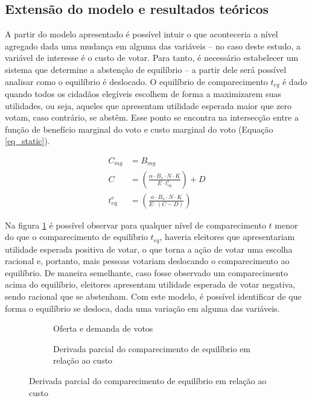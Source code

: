 \subsection{Extensão do modelo e resultados teóricos}

A partir do modelo apresentado é possível intuir o que aconteceria a nível agregado dada uma mudança em alguma das variáveis -- no caso deste estudo, a variável de interesse é o custo de votar. Para tanto, é necessário estabelecer um sistema que determine a abstenção de equilíbrio -- a partir dele será possível analisar como o equilíbrio é deslocado. O equilíbrio de comparecimento $t_{eq}$ é dado quando todos os cidadãos elegíveis escolhem de forma a maximizarem suas utilidades, ou seja, aqueles que apresentam utilidade esperada maior que zero votam, caso contrário, se abstêm. Esse ponto se encontra na intersecção entre a função de benefício marginal do voto e custo marginal do voto (Equação \ref{eq_static}). 

\begin{equation}
  \label{eq_static}
  \begin{aligned}
      C_{mg}&= B_{mg}\\
      C &=\left(\frac{\alpha\cdot B_s\cdot N\cdot K}{E\cdot t_{eq}^e}\right)+D \\
      t_{eq}^e&=\left(\frac{\alpha\cdot B_s\cdot N\cdot K}{E\cdot (C-D)}\right)
  \end{aligned}
  \end{equation}

Na figura \ref{fig_static1} é possível observar para qualquer nível de comparecimento $t$ menor do que o comparecimento de equilíbrio $t_{eq}$, haveria eleitores que apresentariam utilidade esperada positiva de votar, o que torna a ação de votar uma escolha racional e, portanto, mais pessoas votariam deslocando o comparecimento ao equilíbrio. De maneira semelhante, caso fosse observado um comparecimento acima do equilíbrio, eleitores apresentam utilidade esperada de votar negativa, sendo racional que se abstenham. Com este modelo, é possível identificar de que forma o equilíbrio se desloca, dada uma variação em alguma das variáveis.



\begin{figure}
    \caption{Visualização do modelo microeconômico}
    \begin{subfigure}[t]{0.45\linewidth}
      
      \caption{Oferta e demanda de votos}
      \label{fig_static1}
    \end{subfigure}
    \hfill
    \begin{subfigure}[t]{0.45\linewidth}
      
      \caption{Derivada parcial do comparecimento de equilíbrio em relação ao custo}
      \label{fig_static2}
    \end{subfigure}
    \label{fig_staticA}
  \end{figure}

